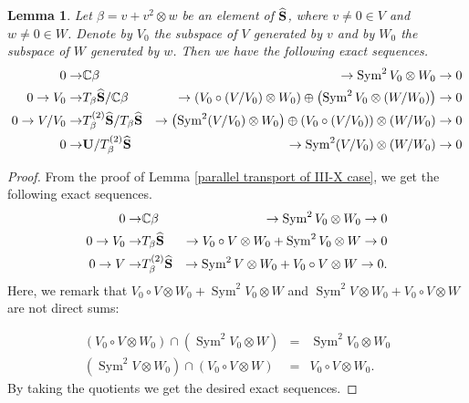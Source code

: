 \documentclass[12pt]{amsart}
\theoremstyle{plain}
\newtheorem{lemma} [theorem]{Lemma}
\theoremstyle{definition}
\def\Sym{\operatorname{Sym}}
\begin{document}
\begin{lemma} \label{lem:finer exact sequences} Let $\beta=v + v^2 \otimes w $ be an element of  $ \widehat{\bf S}$, where $v \not=0 \in V$ and $w\not=0 \in W$. Denote by $V_0$ the subspace of $V$ generated by $v$ and by $W_0$ the subspace of $W$ generated by $w$. Then
we have the following exact sequences.
%
\begin{eqnarray*}
0 \rightarrow &\mathbb C \beta& \rightarrow \Sym^2 V_0 \otimes W_0 \rightarrow 0 \\
0 \rightarrow V_0 \rightarrow &T_{\beta}{\widehat{\bf S}}/\mathbb C \beta& \rightarrow \left(V_0 \circ(V/V_0) \otimes W_0\right) \oplus \left( \Sym^2 V_0 \otimes(W/W_0)\right) \rightarrow 0 \\
0 \rightarrow V/V_0 \rightarrow &T^{(2)}_{\beta}\widehat{\bf S}/T_{\beta}\widehat{\bf S}& \rightarrow \left(\Sym^2(V/V_0) \otimes W_0\right) \oplus \left( V_0 \circ (V/V_0) \right) \otimes(W/W_0) \rightarrow 0 \\
0 \rightarrow &{\bf U}/T^{(2)}_{\beta}\widehat{\bf S}& \rightarrow \Sym^2(V/V_0) \otimes (W/W_0) \rightarrow 0
\end{eqnarray*}
\end{lemma}

\begin{proof} From the proof of Lemma \ref{parallel transport of III-X case}, we get the following exact sequences.
\begin{eqnarray*}
0 \rightarrow &\mathbb C \beta& \rightarrow \Sym^2 V_0 \otimes W_0 \rightarrow 0 \\
0 \rightarrow V_0 \rightarrow &T _{\beta}\widehat{\bf S}& \rightarrow V_0 \circ V \otimes W_0 + \Sym^2V_0 \otimes W \rightarrow 0 \\
0 \rightarrow V \rightarrow  &T^{(2)}_{\beta}\widehat{\bf S}& \rightarrow \Sym^2V \otimes W_0 + V_0 \circ V \otimes W \rightarrow 0.
\end{eqnarray*}
Here, we remark that $V_0 \circ V \otimes W_0 + \Sym^2V_0 \otimes W$ and $\Sym^2V \otimes W_0 + V_0 \circ V \otimes W$ are not direct sums:

\begin{eqnarray*}
(V_0 \circ V \otimes W_0)  \cap  (\Sym^2V_0 \otimes W)&=&\Sym^2V_0 \otimes W_0 \\
(\Sym^2V \otimes W_0) \cap ( V_0 \circ V \otimes W)&=& V_0 \circ V \otimes  W_0.
\end{eqnarray*}
%
By taking the quotients we get the desired exact sequences.
  \end{proof}
\end{document}
